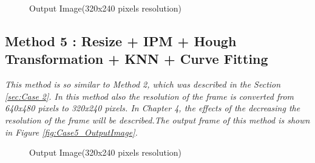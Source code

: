\begin{figure}[H]
  \centering
  \caption{Output Image(320x240 pixels resolution)}
\end{figure}




\subsection{Method 5 : Resize + IPM + Hough Transformation + KNN + Curve Fitting}\label{sec:Case 5}

\emph{\color{blue}This method is so similar to Method 2, which was described in the Section \ref{sec:Case 2}. In this method also the resolution of the frame is converted from 640x480 pixels to 320x240 pixels. In Chapter 4, the effects of the decreasing the resolution of the frame will be described.The output frame of this method is shown in Figure \ref{fig:Case5_OutputImage}.}


\begin{figure}[H]
  \centering
  \caption{Output Image(320x240 pixels resolution)}
\end{figure}






%


